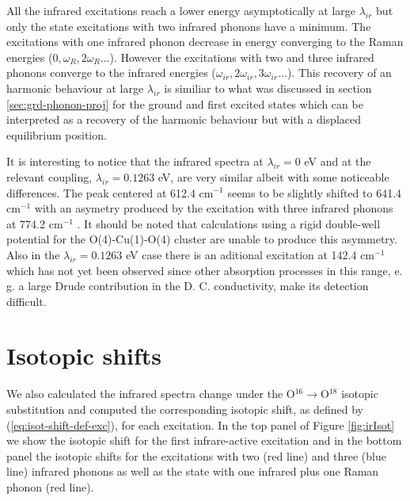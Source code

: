 All the infrared excitations reach a lower energy asymptotically at large $\lambda_{ir}$ but only the state excitations with two infrared phonons have a minimum.
The excitations with one infrared phonon decrease in energy converging to the Raman energies ($0,\omega_R,2\omega_R\ldots$).
However the excitations with two and three infrared phonons converge to the infrared energies ($\omega_{ir},2\omega_{ir},3\omega_{ir}\ldots$).
This recovery of an harmonic behaviour at large $\lambda_{ir}$ is similiar to what was discussed in section \ref{sec:grd-phonon-proj} for the ground and first excited states which can be interpreted as a recovery of the harmonic behaviour but with a displaced equilibrium position.

It is interesting to notice that the infrared spectra at $\lambda_{ir}=0$ eV and at the relevant coupling, $\lambda_{ir}=0.1263$ eV, are very similar albeit with some noticeable differences.
The peak centered at 612.4 cm$^{-1}$ seems to be slightly shifted to 641.4 cm$^{-1}$ with an asymetry produced by the excitation with three infrared phonons at 774.2 cm$^{-1}$ \cite{MustredeLeon1992,Salkola1994}.
It should be noted that calculations using a rigid double-well potential for the O(4)-Cu(1)-O(4) cluster are unable to produce this asymmetry.
Also in the $\lambda_{ir}=0.1263$ eV case there is an aditional excitation at 142.4 cm$^{-1}$ which has not yet been observed since other absorption processes in this range, e. g. a large Drude contribution in the D. C. conductivity, make its detection difficult.

\section{Isotopic shifts}
\label{sec:irIsotopicShifts}

We also calculated the infrared spectra change under the O$^{16}\rightarrow$O$^{18}$ isotopic substitution and computed the corresponding isotopic shift, as defined by (\ref{eq:isot-shift-def-exc}), for each excitation.
In the top panel of Figure \ref{fig:irIsot} we show the isotopic shift for the first infrare-active excitation and in the bottom panel the isotopic shifts for the excitations with two (red line) and three (blue line) infrared phonons as well as the state with one infrared plus one Raman phonon (red line).

